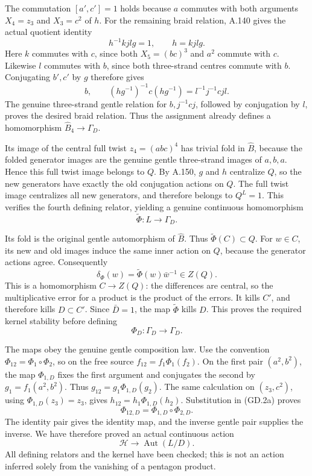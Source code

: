 The commutation $[a',c']=1$ holds because $a$
commutes with both arguments $X_4=z_3$ and
$X_3=c^2$ of $h$. For the remaining braid relation,
A.140 gives the actual quotient identity
\[
                   h^{-1}kjlg=1,
                   \qquad h=kjlg.
 \tag{GD.2b}
\]
Here $k$ commutes with $c$, since both $X_5=(bc)^3$
and $a^2$ commute with $c$. Likewise $l$ commutes
with $b$, since both three-strand centres commute
with $b$. Conjugating $b',c'$ by $g$ therefore
gives
\[
       b,\qquad (hg^{-1})^{-1}c(hg^{-1})
                  =l^{-1}j^{-1}cjl.
\]
The genuine three-strand gentle relation for
$b,j^{-1}cj$, followed by conjugation by $l$,
proves the desired braid relation. Thus the
assignment already defines a homomorphism
$\widehat B_4\to\Gamma_D$.

Its image of the central full twist $z_4=(abc)^4$
has trivial fold in $\widehat B$, because the
folded generator images are the genuine gentle
three-strand images of $a,b,a$. Hence this full
twist image belongs to $Q$. By A.150, $g$ and $h$
centralize $Q$, so the new generators have exactly
the old conjugation actions on $Q$. The full
twist image centralizes all new generators,
and therefore belongs to $Q^L=1$. This verifies
the fourth defining relator, yielding a genuine
continuous homomorphism
\[
                    \widetilde\Phi:L\longrightarrow\Gamma_D.
\]

Its fold is the original gentle automorphism of
$\widehat B$. Thus $\widetilde\Phi(C)\subset Q$.
For $w\in C$, its new and old images induce the
same inner action on $Q$, because the generator
actions agree. Consequently
\[
       \delta_\Phi(w)=\widetilde\Phi(w)\bar w^{-1}\in Z(Q).
 \tag{GD.2c}
\]
This is a homomorphism $C\to Z(Q)$: the differences
are central, so the multiplicative error for a
product is the product of the errors. It kills
$C'$, and therefore kills $D\subset C'$.
Since $\bar D=1$, the map $\widetilde\Phi$
kills $D$. This proves the required kernel
stability before defining
\[
                    \Phi_D:\Gamma_D\longrightarrow\Gamma_D.
\]

The maps obey the genuine gentle composition law.
Use the convention $\Phi_{12}=\Phi_1\circ\Phi_2$,
so on the free source
$f_{12}=f_1\Phi_1(f_2)$. On the first pair
$(a^2,b^2)$, the map $\Phi_{1,D}$ fixes the first
argument and conjugates the second by
$g_1=f_1(a^2,b^2)$. Thus
$g_{12}=g_1\Phi_{1,D}(g_2)$. The same calculation
on $(z_3,c^2)$, using $\Phi_{1,D}(z_3)=z_3$,
gives $h_{12}=h_1\Phi_{1,D}(h_2)$.
Substitution in (GD.2a) proves
\[
              \Phi_{12,D}=\Phi_{1,D}\circ\Phi_{2,D}.
\]
The identity pair gives the identity map, and
the inverse gentle pair supplies the inverse.
We have therefore proved an actual continuous
action
\[
                 \boxed{\ \mathcal H\longrightarrow
                             \operatorname{Aut}(L/D).\ }
 \tag{GD.2d}
\]
All defining relators and the kernel have been
checked; this is not an action inferred solely
from the vanishing of a pentagon product.

